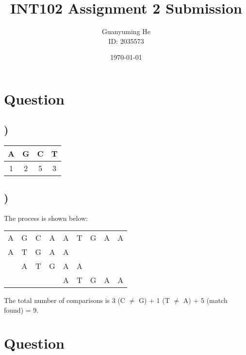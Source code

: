 \documentclass{article}
\author{Guanyuming He\\ID: 2035573}
\title{INT102 Assignment 2 Submission}
\date{\today}
\begin{document}
	\maketitle
	
	\newpage
	
\section{Question }
\subsection{)}
\begin{center}
\begin{tabular}{|c|c|c|c|}
\hline
A & G & C & T \\
\hline
1 & 2 & 5 & 3 \\
\hline
\end{tabular}
\end{center}

\subsection{)}
The process is shown below:
\begin{center}
\begin{tabular}{|ccccccccc|}
	\hline
	A & G & C & A & A & T & G & A & A \\
	A & T & G & A & A &   &   &   &   \\
	  & A & T & G & A & A &   &   &   \\
	  &   &   &   & A & T & G & A & A \\
	\hline
\end{tabular}
\end{center}
The total number of comparisons is 3 (C $\ne$ G) + 1 (T $\ne$ A) + 5 (match found) = 9.

\section{Question }
\end{document}
